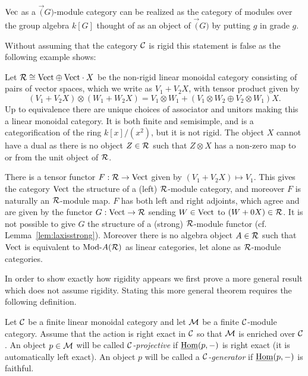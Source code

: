 \documentclass{amsart}
\begin{document}
\begin{example}
$\Vec$ as a $\Vec(G)$-module category can be realized as the category of modules over the group algebra $k[G] $ thought of as an object of $\Vec(G)$ by putting $g$ in grade $g$.  
\end{example}

Without assuming that the category $\cC$ is rigid this statement is false as the following example shows: 

\begin{example} \label{ex:lax-module}
	Let $\cR \cong \Vect \oplus \Vect \cdot X$ be the non-rigid linear monoidal category consisting of pairs of vector spaces, which we write as $V_1 + V_2 X$, with tensor product given by 
	\begin{equation*}
		(V_1 + V_2 X) \otimes (W_1 + W_2 X) = V_1 \otimes W_1  +  (V_1 \otimes W_2 \oplus V_2 \otimes W_1)X.
	\end{equation*} 
	Up to equivalence there are unique choices of associator and unitors making this a linear monoidal category. 
It is both finite and semisimple, and is a categorification of the ring $k[x]/(x^2)$, but it is not rigid. The object $X$ cannot have a dual as there is no object $Z \in \cR$ such that $Z \otimes X$ has a non-zero map to or from the unit object of $\cR$. 
	
	There is a tensor functor $F:\cR \to \Vect$ given by $(V_1 + V_2 X) \mapsto V_1$. This gives the category $\Vect$ the structure of a (left) $\cR$-module category, and moreover $F$ is naturally an $\cR$-module map. $F$ has both left and right adjoints, which agree and are given by the functor $G: \Vect \to \cR$ sending $W \in \Vect$ to $(W + 0 X) \in \cR$. It is not possible to give $G$ the structure of a (strong) $\cR$-module functor (cf. Lemma~\ref{lem:laxisstrong}). Moreover there is no algebra object $A \in \cR$ such that $\Vect$ is equivalent to $\Mod{}{A}(\cR)$ as linear categories, let alone as $\cR$-module categories. 
\end{example}

In order to show exactly how rigidity appears we first prove a more general result which does not assume rigidity.  Stating this more general theorem requires the following definition.

\begin{definition}
	Let $\cC$ be a finite linear monoidal category and let $\cM$ be a finite $\cC$-module category. Assume that the action is right exact in $\cC$ so that $\cM$ is enriched over $\cC$. 
	An object $p \in \cM$ will be called {\em $\cC$-projective} if $\IHom(p, -)$ is right exact (it is automatically left exact). An object $p$ will be called a {\em $\cC$-generator} if $\IHom(p,-)$ is faithful.
\end{definition}
\end{document}
